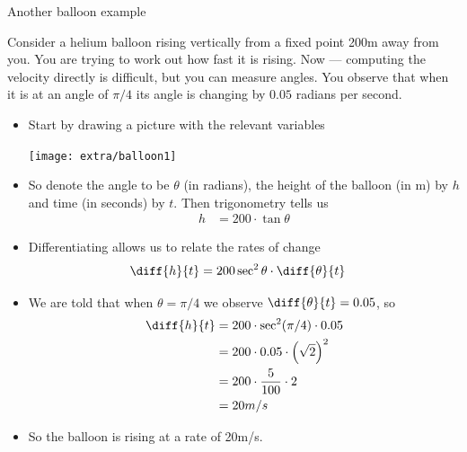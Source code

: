Another balloon example
\begin{eg}\label{eg_3_2_1}
Consider a helium balloon rising vertically from a fixed point 200m away from
you. You are trying to work out how fast it is rising. Now --- computing the
velocity directly is difficult, but you can measure angles. You observe that
when it is at an angle of $\pi/4$ its angle is changing by $0.05$ radians per
second.

\begin{itemize}
 \item Start by drawing a picture with the relevant variables
\begin{efig}
\begin{center}
 \texttt{[image: extra/balloon1]}
\end{center}
\end{efig}
\item So denote the angle to be $\theta$ (in radians), the height of the balloon (in m)
by $h$ and time (in seconds) by $t$. Then trigonometry tells us
\begin{align*}
  h &= 200 \cdot \tan \theta
\end{align*}
\item Differentiating allows us to relate the rates of change
\begin{align*}
  \diff{h}{t} &= 200 \sec^2 \theta \cdot \diff{\theta}{t}
\end{align*}
\item We are told that when $\theta =\pi/4$ we observe $\diff{\theta}{t} =
0.05$, so
\begin{align*}
  \diff{h}{t} &= 200 \cdot \sec^2(\pi/4) \cdot 0.05 \\
  &= 200 \cdot 0.05 \cdot \left( \sqrt{2} \right)^2 \\
  &= 200 \cdot \frac{5}{100} \cdot 2 \\
  &= 20 m/s
\end{align*}
\item So the balloon is rising at a rate of 20m/s.
\end{itemize}

\end{eg}


